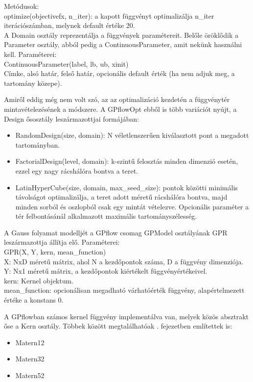 Metódusok:\\
optimize(objectivefx, n\_iter): a kapott függvényt optimalizálja n\_iter iterációszámban, melynek default értéke 20.\\

A Domain osztály reprezentálja a függvények paramétereit. Belőle öröklődik a Parameter osztály, abból pedig a ContinuousParameter, amit nekünk használni kell. Paraméterei: \\
ContinuousParameter(label, lb, ub, xinit)\\
Címke, alsó határ, felső határ, opcionális default érték (ha nem adjuk meg, a tartomány közepe).

Amiről eddig még nem volt szó, az az optimalizáció kezdetén a függvénytér mintavételezésének a módszere. A GPflowOpt ebből is több variációt nyújt, a Design ősosztály leszármazottjai formájában: 
\begin{itemize}
	\item RandomDesign(size, domain): N véletlenszerűen kiválasztott pont a megadott tartományban.
	\item FactorialDesign(level, domain): k-szintű felosztás minden dimenzió esetén, ezzel egy nagy rácshálóra bontva a teret.
	\item LatinHyperCube(size, domain, max\_seed\_size): pontok közötti minimális távolságot optimalizálja, a teret adott méretű rácshálóra bontva, majd minden sorból és oszlopból csak egy mintát vételezve. Opcionális paraméter a tér felbontásánál alkalmazott maximális tartományszélesség.
\end{itemize}

A Gauss folyamat modelljét a GPflow csomag GPModel osztályának GPR leszármazottja állítja elő. Paraméterei:\\
GPR(X, Y, kern, mean\_function)\\
X: NxD méretű mátrix, ahol N a kezdőpontok száma, D a függvény dimenziója.\\
Y: Nx1 méretű mátrix, a kezdőpontok kiértékelt függvényértékeivel.\\
kern: Kernel objektum.\\
mean\_function: opcionálisan megadható várhatóérték függvény, alapértelmezett értéke a konstans 0.

A GPflowban számos kernel függvény implementálva van, melyek közös absztrakt őse a Kern osztály. Többek között megtalálhatóak . fejezetben említettek is:
\begin{itemize}
	\item Matern12
	\item Matern32
	\item Matern52
\end{itemize} 

